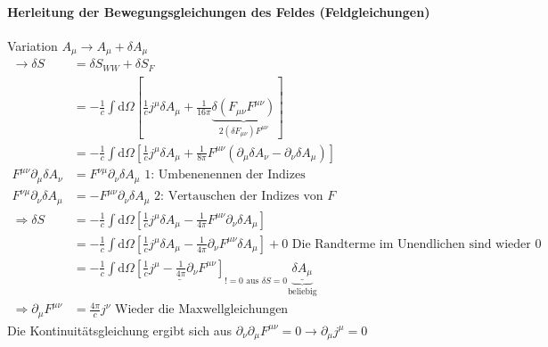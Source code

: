 \documentclass[a4paper]{article}
\begin{document}
\paragraph{Herleitung der Bewegungsgleichungen des Feldes (Feldgleichungen)}
Variation $A_\mu \rightarrow A_\mu+\delta A_\mu$
\begin{align}
\rightarrow \delta S&=\delta S_{WW}+\delta S_F\\
&=-\frac{1}{c}\int \mathrm{d}\Omega \left[ \frac{1}{c} j^\mu \delta\!A_\mu +
\frac{1}{16\pi} \underbrace{\delta(F_{\mu\nu}F^{\mu\nu})}_{2(\delta F_{\mu\nu})
F^{\mu\nu}} \right]\\
&=-\frac{1}{c}\int \mathrm{d}\Omega \left[ \frac{1}{c} j^\mu \delta\!A_\mu +
\frac{1}{8\pi} F^{\mu\nu}\left( \partial_\mu\delta\!A_\nu-
\partial_\nu\delta\!A_\mu \right)\right]\\
F^{\mu\nu} \partial_\mu\delta\!A_\nu&=F^{\nu\mu} \partial_\nu\delta\!A_\mu
\text{ 1: Umbenenennen der Indizes}\\
F^{\nu\mu} \partial_\nu\delta\!A_\mu&=-F^{\mu\nu} \partial_\nu\delta\!A_\mu
\text{ 2: Vertauschen der Indizes von }F\\
\Rightarrow \delta S &= -\frac{1}{c}\int \mathrm{d}\Omega \left[ \frac{1}{c} j^\mu
\delta\!A_\mu - \frac{1}{4\pi} F^{\mu\nu} \partial_\nu\delta\!A_\mu \right]\\
&= -\frac{1}{c}\int \mathrm{d}\Omega \left[ \frac{1}{c} j^\mu
\delta\!A_\mu - \frac{1}{4\pi} \partial_\nu F^{\mu\nu} \delta\!A_\mu \right] +0
\text{ Die Randterme im Unendlichen sind wieder 0} \\
&= -\frac{1}{c}\int \mathrm{d}\Omega \underline{\left[ \frac{1}{c} j^\mu - \frac{1}{4\pi}
\partial_\nu F^{\mu\nu}\right]}_{!=0 \text{ aus } \delta\!S=0}
\underbrace{\underline{\delta\!A_\mu}}_{\text{beliebig}}\\
\Rightarrow \partial_\mu F^{\mu\nu}&=\frac{4\pi}{c}j^\nu \text{ Wieder die
Maxwellgleichungen}
\end{align}
Die Kontinuitätsgleichung ergibt sich aus $\partial_\nu\partial_\mu
F^{\mu\nu}=0 \rightarrow \partial_\mu j^\mu=0$
\end{document}
